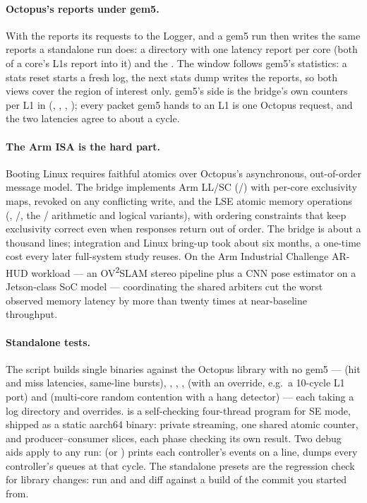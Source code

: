 \paragraph{Octopus's reports under gem5.} With  the
 reports its requests to the Logger, and a gem5 run then writes the same
reports a standalone run does: a  directory with one latency report per core
(both of a core's L1s report into it) and the . The window follows
gem5's statistics: a stats reset starts a fresh log, the next stats dump writes the reports, so
both views cover the region of interest only. gem5's side is the bridge's own counters per L1 in
 (, , , ); every
packet gem5 hands to an L1 is one Octopus request, and the two latencies agree to about a cycle.

\paragraph{The Arm ISA is the hard part.} Booting Linux requires faithful atomics over
Octopus's asynchronous, out-of-order message model. The bridge implements Arm LL/SC
(/) with per-core exclusivity maps, revoked on any conflicting write, and
the LSE atomic memory operations (, /, the /
arithmetic and logical variants), with ordering constraints that keep exclusivity correct even
when responses return out of order. The bridge is about a thousand lines; integration and Linux
bring-up took about six months, a one-time cost every later full-system study reuses. On the
Arm Industrial Challenge AR-HUD workload --- an OV\textsuperscript{2}SLAM stereo pipeline plus a
CNN pose estimator on a Jetson-class SoC model --- coordinating the shared arbiters cut the
worst observed memory latency by more than twenty times at near-baseline throughput.

\paragraph{Standalone tests.} The script  builds single
binaries against the Octopus library with no gem5 ---  (hit and miss latencies,
same-line bursts),
, , ,  (with an override, e.g.\ a 10-cycle L1 port)
and  (multi-core random contention with a hang detector) --- each taking a log
directory and  overrides.  is a self-checking
four-thread program for SE mode, shipped as a static aarch64 binary: private streaming, one
shared atomic counter, and producer--consumer slices, each phase checking its own result. Two
debug aids apply to any run:  (or ) prints each
controller's events on a line,  dumps every controller's
queues at that cycle. The standalone presets are the regression check for library changes: run
 and  and diff
 against a build of the commit you started from.

